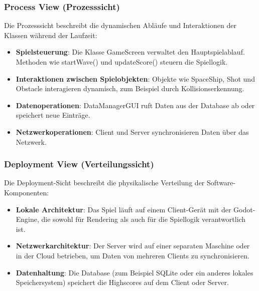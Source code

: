 \documentclass[10pt]{article}
\begin{document}


\newpage
\subsubsection{Process View (Prozesssicht)}
Die Prozesssicht beschreibt die dynamischen Abläufe und Interaktionen der Klassen während der Laufzeit:
\begin{itemize}
    \item \textbf{Spielsteuerung}:
     Die Klasse GameScreen verwaltet den Hauptspielablauf. Methoden wie startWave() und updateScore() steuern die Spiellogik.
    \item \textbf{Interaktionen zwischen Spielobjekten}: Objekte wie SpaceShip, Shot und Obstacle interagieren dynamisch, zum Beispiel durch Kollisionserkennung.
    \item \textbf{Datenoperationen}:
DataManagerGUI ruft Daten aus der Database ab oder speichert neue Einträge.
    \item \textbf{Netzwerkoperationen}:
Client und Server synchronisieren Daten über das Netzwerk.
\end{itemize}

\subsubsection{Deployment View (Verteilungssicht)}
Die Deployment-Sicht beschreibt die physikalische Verteilung der Software-Komponenten:
\begin{itemize}
    \item \textbf{Lokale Architektur}:
Das Spiel läuft auf einem Client-Gerät mit der Godot-Engine, die sowohl für Rendering als auch für die Spiellogik verantwortlich ist.
    \item \textbf{Netzwerkarchitektur}:
Der Server wird auf einer separaten Maschine oder in der Cloud betrieben, um Daten von mehreren Clients zu synchronisieren.
    \item \textbf{Datenhaltung}:
Die Database (zum Beispiel SQLite oder ein anderes lokales Speichersystem) speichert die Highscores auf dem Client oder Server.
\end{itemize}
\end{document}
